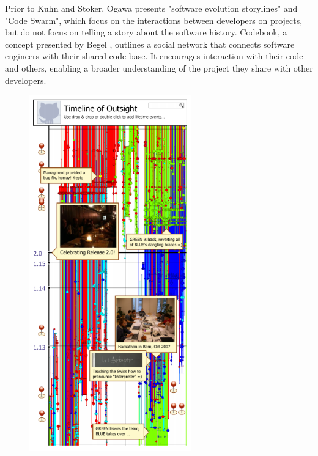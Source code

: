 \documentclass{egpubl}
\begin{document}
Prior to Kuhn and Stoker, Ogawa \cite{Ogawa,ogawa2009} presents "software evolution storylines" and "Code Swarm", which focus on the interactions between developers on projects, but do not focus on telling a story about the software history. Codebook, a concept presented by Begel \cite{begel2010}, outlines a social network that connects software engineers with their shared code base. It encourages interaction with their code and others, enabling a broader understanding of the project they share with other developers.
\begin{figure}
\begingroup
\centering
\includegraphics[width=7cm]{./images/kuhn2012}
\label{fig:kuhn2012}
\endgroup
\end{figure}
\end{document}
